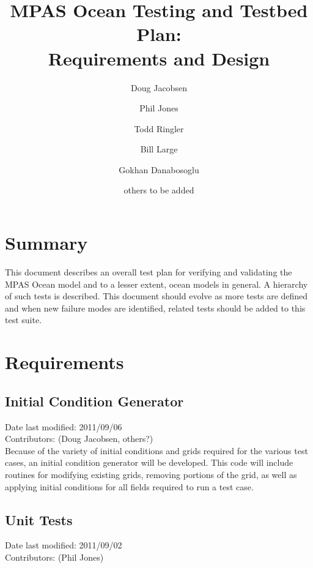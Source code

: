 \documentclass[11pt]{report}
\begin{document}
\title{MPAS Ocean Testing and Testbed Plan: \\
Requirements and Design}
\author{Doug Jacobsen \and Phil Jones \and Todd Ringler \and Bill Large 
        \and Gokhan Danabosoglu \and others to be added}

\maketitle
\tableofcontents


\chapter{Summary}

This document describes an overall test plan for verifying and validating 
the MPAS Ocean model and to a lesser extent, ocean models in general.  A 
hierarchy of such tests is described.  This document should evolve as
more tests are defined and when new failure modes are identified, related
tests should be added to this test suite.


\chapter{Requirements}
\section{Initial Condition Generator}
Date last modified: 2011/09/06 \\
Contributors: (Doug Jacobsen, others?) \\

Because of the variety of initial conditions and grids required for the various
test cases, an initial condition generator will be developed. This code will
include routines for modifying existing grids, removing portions of the grid,
as well as applying initial conditions for all fields required to run a test
case.

\section{Unit Tests}
Date last modified: 2011/09/02 \\
Contributors: (Phil Jones) \\
\end{document}

